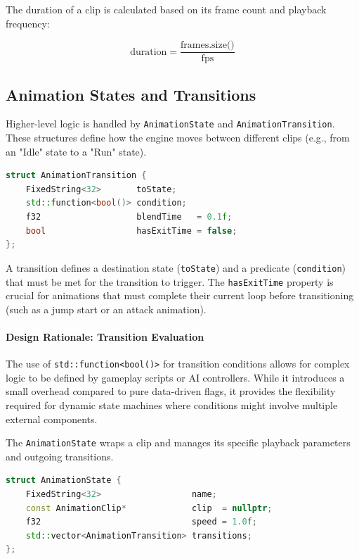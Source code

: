 The duration of a clip is calculated based on its frame count and playback frequency:

\begin{equation}
\text{duration} = \frac{\text{frames.size()}}{\text{fps}}
\end{equation}

\subsection{Animation States and Transitions}

Higher-level logic is handled by \texttt{AnimationState} and \texttt{AnimationTransition}. These structures define how the engine moves between different clips (e.g., from an "Idle" state to a "Run" state).

\begin{lstlisting}[language=C++]
struct AnimationTransition {
    FixedString<32>       toState;
    std::function<bool()> condition;
    f32                   blendTime   = 0.1f;
    bool                  hasExitTime = false;
};
\end{lstlisting}

A transition defines a destination state (\texttt{toState}) and a predicate (\texttt{condition}) that must be met for the transition to trigger. The \texttt{hasExitTime} property is crucial for animations that must complete their current loop before transitioning (such as a jump start or an attack animation).


\paragraph{Design Rationale: Transition Evaluation}

The use of \texttt{std::function<bool()>} for transition conditions allows for complex logic to be defined by gameplay scripts or AI controllers. While it introduces a small overhead compared to pure data-driven flags, it provides the flexibility required for dynamic state machines where conditions might involve multiple external components.



The \texttt{AnimationState} wraps a clip and manages its specific playback parameters and outgoing transitions.

\begin{lstlisting}[language=C++]
struct AnimationState {
    FixedString<32>                  name;
    const AnimationClip*             clip  = nullptr;
    f32                              speed = 1.0f;
    std::vector<AnimationTransition> transitions;
};
\end{lstlisting}


